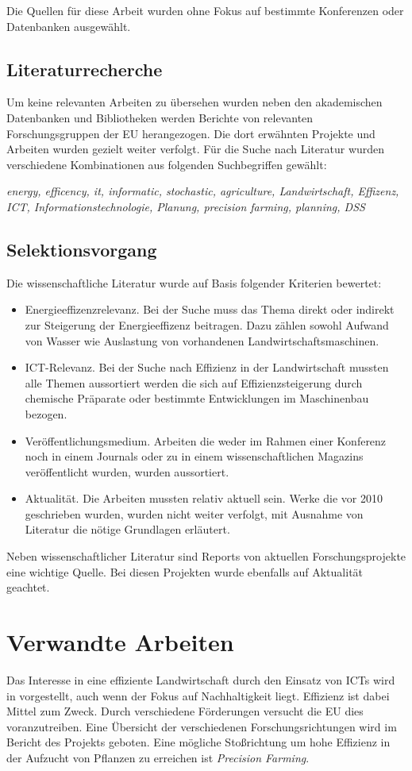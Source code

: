 Die Quellen für diese Arbeit wurden ohne Fokus auf bestimmte Konferenzen oder Datenbanken ausgewählt. 

\subsection{Literaturrecherche}
Um keine relevanten Arbeiten zu übersehen wurden neben den akademischen Datenbanken und Bibliotheken werden Berichte von relevanten Forschungsgruppen der EU herangezogen. Die dort erwähnten Projekte und Arbeiten wurden gezielt weiter verfolgt. Für die Suche nach Literatur wurden verschiedene Kombinationen aus folgenden Suchbegriffen gewählt:

\textit{energy, efficency, it, informatic, stochastic, agriculture, Landwirtschaft, Effizenz, ICT, Informationstechnologie, Planung, precision farming, planning, DSS}

\subsection{Selektionsvorgang}
Die wissenschaftliche Literatur wurde auf Basis folgender Kriterien bewertet:
\begin{itemize}
  \item Energieeffizenzrelevanz. Bei der Suche muss das Thema direkt oder indirekt zur Steigerung der Energieeffizenz beitragen. Dazu zählen sowohl Aufwand von Wasser wie Auslastung von vorhandenen Landwirtschaftsmaschinen.
  \item ICT-Relevanz. Bei der Suche nach Effizienz in der Landwirtschaft mussten alle Themen aussortiert werden die sich auf Effizienzsteigerung durch chemische Präparate oder bestimmte Entwicklungen im Maschinenbau bezogen.
  \item Veröffentlichungsmedium. Arbeiten die weder im Rahmen einer Konferenz noch in einem Journals oder zu in einem wissenschaftlichen Magazins veröffentlicht wurden, wurden aussortiert.
  \item Aktualität. Die Arbeiten mussten relativ aktuell sein. Werke die vor 2010 geschrieben wurden, wurden nicht weiter verfolgt, mit Ausnahme von Literatur die nötige Grundlagen erläutert.
\end{itemize}

Neben wissenschaftlicher Literatur sind Reports von aktuellen Forschungsprojekte eine wichtige Quelle. Bei diesen Projekten wurde ebenfalls auf Aktualität geachtet.

\section{Verwandte Arbeiten}
Das Interesse in eine effiziente Landwirtschaft durch den Einsatz von ICTs wird in \cite{jour:Andreopoulou2012} vorgestellt, auch wenn der Fokus auf Nachhaltigkeit liegt. Effizienz ist dabei Mittel zum Zweck. Durch verschiedene Förderungen versucht die EU dies voranzutreiben. Eine Übersicht der verschiedenen Forschungsrichtungen wird im Bericht des Projekts \cite{misc:Mikkola2013} geboten. Eine mögliche Stoßrichtung um hohe Effizienz in der Aufzucht von Pflanzen zu erreichen ist \textit{Precision Farming}\cite{jour:Auernhammer2001}.

